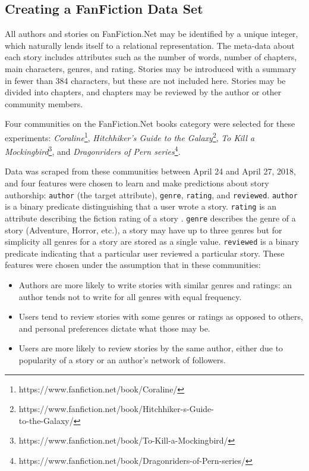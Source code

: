 \documentclass[letterpaper]{article}
\begin{document}
\subsection{Creating a FanFiction Data Set}

All authors and stories on FanFiction.Net may be identified by a unique integer, which naturally lends itself to a relational representation. The meta-data about each story includes attributes such as the number of words, number of chapters, main characters, genres, and rating. Stories may be introduced with a summary in fewer than 384 characters, but these are not included here. Stories may be divided into chapters, and chapters may be reviewed by the author or other community members.

Four communities on the FanFiction.Net books category were selected for these experiments: \textit{Coraline}\footnote{https://www.fanfiction.net/book/Coraline/}, \textit{Hitchhiker's Guide to the Galaxy}\footnote{https://www.fanfiction.net/book/Hitchhiker-s-Guide-\\to-the-Galaxy/}, \textit{To Kill a Mockingbird}\footnote{https://www.fanfiction.net/book/To-Kill-a-Mockingbird/}, and \textit{Dragonriders of Pern series}\footnote{https://www.fanfiction.net/book/Dragonriders-of-Pern-series/}.

Data was scraped from these communities between April 24 and April 27, 2018, and four features were chosen to learn and make predictions about story authorship: \texttt{author} (the target attribute), \texttt{genre}, \texttt{rating}, and \texttt{reviewed}. \texttt{author} is a binary predicate distinguishing that a user wrote a story. \texttt{rating} is an attribute describing the fiction rating of a story \cite{fictionratings}. \texttt{genre} describes the genre of a story (Adventure, Horror, etc.), a story may have up to three genres but for simplicity all genres for a story are stored as a single value. \texttt{reviewed} is a binary predicate indicating that a particular user reviewed a particular story.  These features were chosen under the assumption that in these communities:

\begin{itemize}
    \item Authors are more likely to write stories with similar genres and ratings: an author tends not to write for all genres with equal frequency.
    \item Users tend to review stories with some genres or ratings as opposed to others, and personal preferences dictate what those may be.
    \item Users are more likely to review stories by the same author, either due to popularity of a story or an author's network of followers.
\end{itemize}
\end{document}
